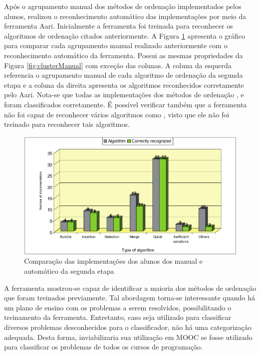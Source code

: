 	    Após o agrupamento manual dos métodos de ordenação implementados pelos alunos,
	     realizou o reconhecimento automático das
	    implementações por meio da ferramenta Aari. Inicialmente a ferramenta foi
	    treinada para reconhecer os algoritmos de ordenação citados anteriormente.
	    A Figura \ref{fig:clusterAutomatico} apresenta o gráfico para comparar cada
	    agrupamento manual realizado anteriormente com o reconhecimento automático
	    da ferramenta. Possui as mesmas propriedades da Figura \ref{fig:clusterManual}
	    com exceção das colunas. A coluna da esquerda referencia o agrupamento manual
	    de cada algoritmo de ordenação da segunda etapa e a coluna da direita apresenta
	    os algoritmos reconhecidos corretamente pelo Aari. Nota-se que todas as
	    implementações dos métodos de ordenação ,
	     e  foram classificados corretamente.
	    É possível verificar também que a ferramenta não foi capaz de reconhecer vários
	    algoritmos como , visto que ele não foi treinado para
	    reconhecer tais algoritmos.
	    
	    \begin{figure}[ht]
	        \centering
	        \includegraphics[scale=0.33]{imagem/clusterAutomatico.png}
	        \captionsetup{justification=centering}
	        \caption{Comparação das implementações dos alunos dos 
	        	manual e automático da segunda etapa}
	        \label{fig:clusterAutomatico}
	    \end{figure}
	    
	    A ferramenta mostrou-se capaz de identificar a maioria dos métodos de ordenação
	    que foram treinados previamente. Tal abordagem torna-se interessante quando
	    há um plano de ensino com os problemas a serem resolvidos, possibilitando
	    o treinamento da ferramenta. Entretanto, caso seja utilizado para classificar
	    diversos problemas desconhecidos para o classificador, não há uma categorização
	    adequada. Desta forma, inviabilizaria sua utilização em MOOC se fosse utilizado
	    para classificar os problemas de todos os cursos de programação.
	    
